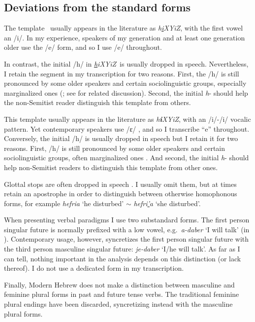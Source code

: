   \subsection{Deviations from the standard forms}
The template \thif~usually appears in the literature as \emph{h\underline{i}XYiZ}, with the first vowel an /i/. In my experience, speakers of my generation and at least one generation older use the /e/ form, and so I use /e/ throughout.

In contrast, the initial /h/ in \emph{\underline{h}iXYiZ}~is usually dropped in speech. Nevertheless, I retain the segment in my transcription for two reasons. First, the /h/ is still pronounced by some older speakers and certain sociolinguistic groups, especially marginalized ones (\citealt{schwarzwald81biu}; see \citealt{gafter14phd} for related discussion). Second, the initial \emph{h}- should help the non-Semitist reader distinguish this template from others.

This template usually appears in the literature as \emph{h\textbf{i}XYiZ}, with an /i/-/i/ vocalic pattern. Yet contemporary speakers use /ɛ/ \citep{trachtman16}, and so I transcribe ``e'' throughout. Conversely, the initial /h/ is usually dropped in speech but I retain it for two reasons. First, /h/ is still pronounced by some older speakers and certain sociolinguistic groups, often marginalized ones \citep[cf.~][]{schwarzwald81biu,gafter14phd}. And second, the initial \emph{h}- should help non-Semitist readers to distinguish this template from other ones.


Glottal stops are often dropped in speech \citep{faust05,faust15iatl}. I usually omit them, but at times retain an apostrophe in order to distinguish between otherwise homophonous forms, for example \emph{hefria} `he disturbed' $\sim$ \emph{hefri\underline{'}a} `she disturbed'.

When presenting verbal paradigms I use two substandard forms. The first person singular future is normally prefixed with a low vowel, e.g.~\emph{a-daber} `I will talk' (in ). Contemporary usage, however, syncretizes the first person singular future with the third person masculine singular future: \emph{je-daber} `I/he will talk'. As far as I can tell, nothing important in the analysis depends on this distinction (or lack thereof). I do not use a dedicated  form in my transcription.

Finally, Modern Hebrew does not make a distinction between masculine and feminine plural forms in past and future tense verbs. The traditional feminine plural endings have been discarded, syncretizing instead with the masculine plural forms.

